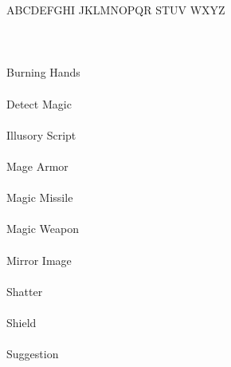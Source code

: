 \documentclass[letterpaper]{article}
\begin{document}
{
    \Large \wizpenfont \noindent %
    ABCDEFGHI \enspace JKLMNOPQR \enspace STUV \enspace WXYZ \\ \\
    \\ \\
    Burning \enspace Hands \\ \\
    Detect \enspace Magic \\ \\
    Illusory \enspace Script \\ \\
    Mage \enspace Armor \\ \\
    Magic \enspace Missile \\ \\
    Magic \enspace Weapon \\ \\
    Mirror \enspace Image \\ \\
    Shatter \\ \\
    Shield \\ \\
    Suggestion \\
}
\end{document}
